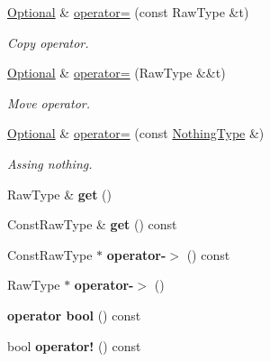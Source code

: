 \begin{DoxyCompactItemize}
\item 
\hypertarget{classOptional_a5a8c6588ed666899bd852579e4580141}{}\label{classOptional_a5a8c6588ed666899bd852579e4580141} 
\hyperlink{classOptional}{Optional} \& \hyperlink{classOptional_a5a8c6588ed666899bd852579e4580141}{operator=} (const Raw\+Type \&t)
\begin{DoxyCompactList}\small\item\em Copy operator. \end{DoxyCompactList}\item 
\hypertarget{classOptional_a622aae8c71487f2e49fa5c47e6d34baa}{}\label{classOptional_a622aae8c71487f2e49fa5c47e6d34baa} 
\hyperlink{classOptional}{Optional} \& \hyperlink{classOptional_a622aae8c71487f2e49fa5c47e6d34baa}{operator=} (Raw\+Type \&\&t)
\begin{DoxyCompactList}\small\item\em Move operator. \end{DoxyCompactList}\item 
\hypertarget{classOptional_a481a7ad95fd05cd1375bc00b8caee544}{}\label{classOptional_a481a7ad95fd05cd1375bc00b8caee544} 
\hyperlink{classOptional}{Optional} \& \hyperlink{classOptional_a481a7ad95fd05cd1375bc00b8caee544}{operator=} (const \hyperlink{structNothingType}{Nothing\+Type} \&)
\begin{DoxyCompactList}\small\item\em Assing \textquotesingle{}nothing\textquotesingle{}. \end{DoxyCompactList}\item 
\hypertarget{classOptional_a447f20ebb4cca99d1c58ecb968678a09}{}\label{classOptional_a447f20ebb4cca99d1c58ecb968678a09} 
Raw\+Type \& {\bfseries get} ()
\item 
\hypertarget{classOptional_a9026ee0972931845f56417bd12d3955b}{}\label{classOptional_a9026ee0972931845f56417bd12d3955b} 
Const\+Raw\+Type \& {\bfseries get} () const
\item 
\hypertarget{classOptional_a2479bfa9bc2120288c3a8b0feee7f91c}{}\label{classOptional_a2479bfa9bc2120288c3a8b0feee7f91c} 
Const\+Raw\+Type $\ast$ {\bfseries operator-\/$>$} () const
\item 
\hypertarget{classOptional_a0cb347583588069768d30cd10acc391f}{}\label{classOptional_a0cb347583588069768d30cd10acc391f} 
Raw\+Type $\ast$ {\bfseries operator-\/$>$} ()
\item 
\hypertarget{classOptional_a58e7e6525d170747555c33b40fb12884}{}\label{classOptional_a58e7e6525d170747555c33b40fb12884} 
{\bfseries operator bool} () const
\item 
\hypertarget{classOptional_a2d423ef9082ece2cc84599d2191b39a1}{}\label{classOptional_a2d423ef9082ece2cc84599d2191b39a1} 
bool {\bfseries operator!} () const
\end{DoxyCompactItemize}


